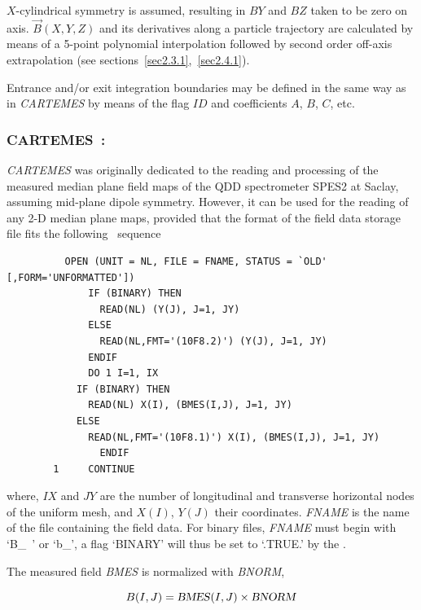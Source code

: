 \bigskip

\noindent $X$-cylindrical symmetry is assumed, resulting in $BY$ and $BZ$ taken to 
be zero on axis. $ \vec {B} {(X,Y,Z)} $ and its derivatives along a
particle trajectory are calculated by means of a 5-point polynomial interpolation followed by second 
order off-axis  extrapolation (see sections~\ref{sec2.3.1},~\ref{sec2.4.1}).  
\bigskip

\noindent Entrance and/or exit integration boundaries may be defined in the same way 
as in \textsl{CARTEMES} by means of the flag $ID$ and coefficients
$A$, $B$, $C$, etc. 

\newpage

\subsubsection*{CARTEMES~: \CARTEMESTitl}\label{CARTEMES}
\medskip

\textsl{CARTEMES}  was originally dedicated to the reading 
and processing of the measured median plane field maps of the QDD spectrometer  SPES2 at Saclay, 
assuming mid-plane dipole symmetry.  However, it can be
used for the reading of any 2-D median plane maps, provided that the format of the
field data storage file fits the following \FORTRAN\ sequence 


{\footnotesize
\begin{verbatim}
	      OPEN (UNIT = NL, FILE = FNAME, STATUS = `OLD' [,FORM='UNFORMATTED'])
              IF (BINARY) THEN 
                READ(NL) (Y(J), J=1, JY)
              ELSE
                READ(NL,FMT='(10F8.2)') (Y(J), J=1, JY)
              ENDIF
              DO 1 I=1, IX
	        IF (BINARY) THEN 
	          READ(NL) X(I), (BMES(I,J), J=1, JY)
	        ELSE
	          READ(NL,FMT='(10F8.1)') X(I), (BMES(I,J), J=1, JY) 
                ENDIF
        1     CONTINUE
\end{verbatim}}

\noindent where, $IX$  and $JY$  are the number of longitudinal
and transverse horizontal nodes of the uniform mesh, and $X(I)$, $Y(J)$ their coordinates.  
\textsl{FNAME} 
 is the name of the file containing the field data. For binary files, \textsl{FNAME} must begin with
\mbox{`B\_ '} or \mbox{`b\_'},  a flag `BINARY' will thus be set to `.TRUE.' by the \FORTRAN.  
\bigskip

\noindent The measured field \textsl{BMES} is normalized with \textsl{BNORM},

$$ B(I,J) = \text{\textsl{BMES}}(I,J) \times  \text{\textsl{BNORM}} $$

